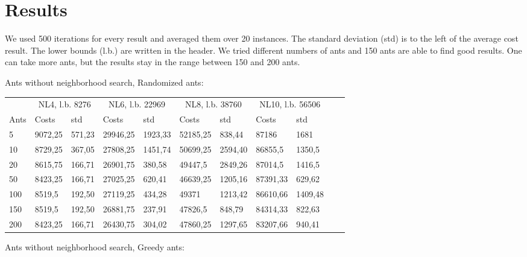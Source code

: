 \section{Results}

We used 500 iterations for every result and averaged them over 20 instances. The
standard deviation (std) is to the left of the average cost result. The lower
bounds (l.b.) are written in the header. We tried different numbers of ants and
150 ants are able to find good results. One can take more ants, but the results
stay in the range between 150 and 200 ants.

Ants without neighborhood search, Randomized ants:
\newline
\begin{minipage}[b]{1.0\textwidth}
    \begin{tabular}{ l | ll | ll | ll | ll | ll}
	\hline
	& \multicolumn{2}{c}{NL4, l.b. 8276} & \multicolumn{2}{c}{NL6, l.b. 22969}
	& \multicolumn{2}{c}{NL8, l.b. 38760} & \multicolumn{2}{c}{NL10, l.b. 56506} \\
	\cline{1-9}
	Ants & Costs & std & Costs & std & Costs & std & Costs & std \\
	\hline
	5     &  9072,25    & 571,23 &  29946,25    & 1923,33 &  52185,25   & 838,44 &  87186    & 1681 \\
	10    &  8729,25    & 367,05 &  27808,25    & 1451,74 &  50699,25   & 2594,40 &  86855,5    & 1350,5 \\
	20    &  8615,75    & 166,71 &  26901,75    & 380,58 &  49447,5    & 2849,26 &  87014,5    & 1416,5 \\
	50    &  8423,25    & 166,71 &  27025,25    & 620,41 &  46639,25   & 1205,16 &  87391,33    & 629,62 \\
	100   &  8519,5    & 192,50 &  27119,25    & 434,28 &  49371      & 1213,42 &  86610,66    & 1409,48 \\
	150   &  8519,5    & 192,50 &  26881,75    & 237,91 &  47826,5    & 848,79 &  84314,33    & 822,63 \\
	200   &  8423,25    & 166,71 &  26430,75    & 304,02 &  47860,25   & 1297,65 &  83207,66    & 940,41 \\
	\hline
	\end{tabular}
\end{minipage}
\newline
Ants without neighborhood search, Greedy ants:
\newline
